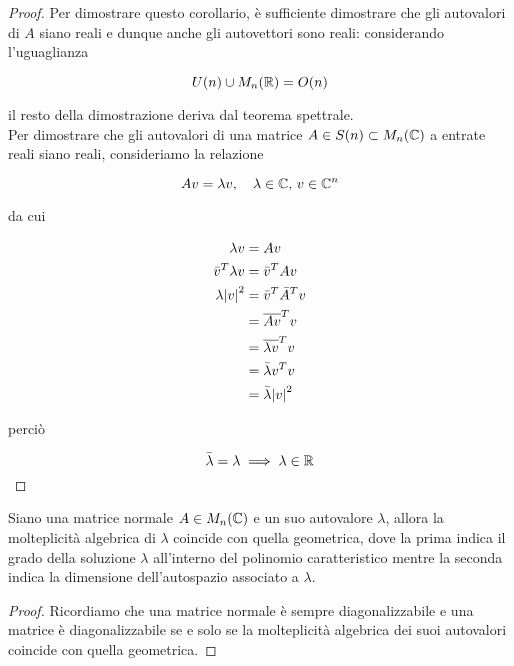 \begin{proof}
	Per dimostrare questo corollario, è sufficiente dimostrare che gli autovalori di $ A $ siano reali e dunque anche gli autovettori sono reali: considerando l'uguaglianza
	
	\begin{equation}
		U(n) \cup M_{n}(\mathbb{R}) = O(n)
	\end{equation}

	il resto della dimostrazione deriva dal teorema spettrale.\\
	Per dimostrare che gli autovalori di una matrice $ A \in S(n) \subset M_{n}(\mathbb{C}) $  a entrate reali siano reali, consideriamo la relazione
	
	\begin{equation}
		A v = \lambda v \qcomma \lambda \in \C, \, v \in \C^{n}
	\end{equation}

	da cui

	\begin{align}
		\begin{split}
			\lambda v &= A v \\
			\bar{v}^{T} \lambda v &= \bar{v}^{T} A v \\
			\lambda \abs{v}^{2} &= \bar{v}^{T} \bar{A}^{T} v \\
			&= \overline{A v}^{T} v \\
			&= \overline{\lambda v}^{T} v \\
			&= \bar{\lambda} v^{T} v \\
			&= \bar{\lambda} \abs{v}^{2}
		\end{split}
	\end{align}

	perciò
	
	\begin{equation}
		\bar{\lambda} = \lambda \implies \lambda \in \mathbb{R}
	\end{equation}
\end{proof}

\begin{corollary}[2]
	Siano una matrice normale $ A \in M_{n}(\mathbb{C}) $ e un suo autovalore $ \lambda $, allora la molteplicità algebrica di $ \lambda $ coincide con quella geometrica, dove la prima indica il grado della soluzione $ \lambda $ all'interno del polinomio caratteristico mentre la seconda indica la dimensione dell'autospazio associato a $ \lambda $.
\end{corollary}

\begin{proof}
	Ricordiamo che una matrice normale è sempre diagonalizzabile e una matrice è diagonalizzabile se e solo se la molteplicità algebrica dei suoi autovalori coincide con quella geometrica.
\end{proof}

